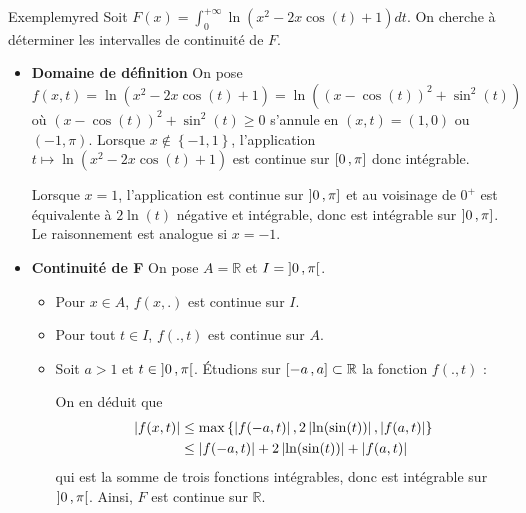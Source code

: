    \begin{omed}{Exemple}{myred}
        Soit $F(x) = \int_{0}^{+\infty} \ln(x^2 - 2x \cos(t) + 1) dt$. On cherche à déterminer les intervalles de continuité de $F$.
        \begin{itemize}
            \item \textbf{Domaine de définition} \quad On pose $f(x,t) = \ln(x^2 - 2x \cos(t) + 1) = \ln((x - \cos(t))^2 + \sin^2(t))$ où $(x - \cos(t))^2 + \sin^2(t) \geq 0$ s’annule en $(x,t) = (1,0)$ ou $(-1,\pi)$. Lorsque $x \notin \left\{-1,1\right\}$, l’application $t \mapsto \ln(x^2 - 2 x \cos(t) + 1)$ est continue sur $\left[ 0 \, , \pi \right]$ donc intégrable.
            
            Lorsque $x = 1$, l’application est continue sur $\left] 0 \, , \pi \right]$ et au voisinage de $0^+$ est équivalente à $2 \ln(t)$ négative et intégrable, donc est intégrable sur $\left] 0 \, , \pi \right]$. Le raisonnement est analogue si $x = -1$. 
            \item \textbf{Continuité de F} On pose $A = \mathbb{R}$ et $I = \left] 0 \, , \pi \right[$. 
            \begin{itemize}
                \item Pour $x \in A$, $f(x,.)$ est continue sur $I$.
                \item Pour tout $t \in I$, $f(.,t)$ est continue sur $A$.
                \item Soit $a > 1$ et $t \in \left] 0 \, , \pi \right[$. Étudions sur $\left[ -a \, , a \right] \subset \mathbb{R}$ la fonction $f(.,t)$ :
                \begin{center}
                \end{center}
                On en déduit que 
                \begin{align*}
                    \left\lvert f(x,t)\right\rvert 
                    &\leq \max\left\{\left\lvert f(-a,t)\right\rvert, 2 \left\lvert \ln(\sin(t))\right\rvert, \left\lvert f(a,t)\right\rvert\right\} \\
                    &\leq \left\lvert f(-a,t)\right\rvert + 2 \left\lvert \ln(\sin(t))\right\rvert + \left\lvert f(a,t)\right\rvert
                \end{align*}
                qui est la somme de trois fonctions intégrables, donc est intégrable sur $\left] 0 \, , \pi \right[$. Ainsi, $F$ est continue sur $\mathbb{R}$.
            \end{itemize}
        \end{itemize}
    \end{omed}

